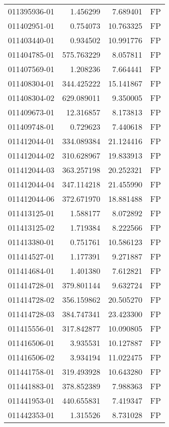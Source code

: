 \begin{tabular}{lrrl}
011395936-01 &    1.456299 &     7.689401 &   FP \\
011402951-01 &    0.754073 &    10.763325 &   FP \\
011403440-01 &    0.934502 &    10.991776 &   FP \\
011404785-01 &  575.763229 &     8.057811 &   FP \\
011407569-01 &    1.208236 &     7.664441 &   FP \\
011408304-01 &  344.425222 &    15.141867 &   FP \\
011408304-02 &  629.089011 &     9.350005 &   FP \\
011409673-01 &   12.316857 &     8.173813 &   FP \\
011409748-01 &    0.729623 &     7.440618 &   FP \\
011412044-01 &  334.089384 &    21.124416 &   FP \\
011412044-02 &  310.628967 &    19.833913 &   FP \\
011412044-03 &  363.257198 &    20.252321 &   FP \\
011412044-04 &  347.114218 &    21.455990 &   FP \\
011412044-06 &  372.671970 &    18.881488 &   FP \\
011413125-01 &    1.588177 &     8.072892 &   FP \\
011413125-02 &    1.719384 &     8.222566 &   FP \\
011413380-01 &    0.751761 &    10.586123 &   FP \\
011414527-01 &    1.177391 &     9.271887 &   FP \\
011414684-01 &    1.401380 &     7.612821 &   FP \\
011414728-01 &  379.801144 &     9.632724 &   FP \\
011414728-02 &  356.159862 &    20.505270 &   FP \\
011414728-03 &  384.747341 &    23.423300 &   FP \\
011415556-01 &  317.842877 &    10.090805 &   FP \\
011416506-01 &    3.935531 &    10.127887 &   FP \\
011416506-02 &    3.934194 &    11.022475 &   FP \\
011441758-01 &  319.493928 &    10.643280 &   FP \\
011441883-01 &  378.852389 &     7.988363 &   FP \\
011441953-01 &  440.655831 &     7.419347 &   FP \\
011442353-01 &    1.315526 &     8.731028 &   FP \\

\end{tabular}

